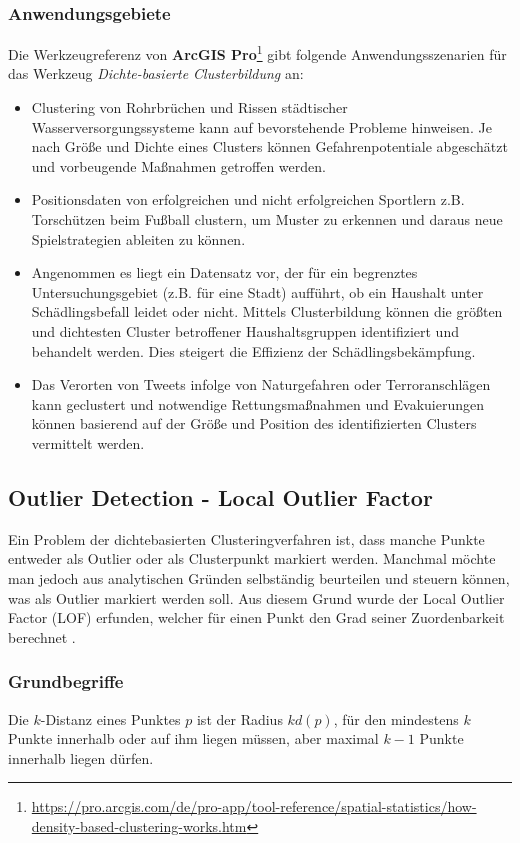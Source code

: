 \documentclass[11pt,ceqn]{book}
\begin{document}
\subsubsection{Anwendungsgebiete}
Die Werkzeugreferenz von \textbf{ArcGIS Pro}\footnote{\url{https://pro.arcgis.com/de/pro-app/tool-reference/spatial-statistics/how-density-based-clustering-works.htm}} gibt folgende Anwendungsszenarien für das Werkzeug \textit{Dichte-basierte Clusterbildung} an:

\begin{itemize}
\item Clustering von Rohrbrüchen und Rissen städtischer Wasserversorgungssysteme kann auf bevorstehende Probleme hinweisen. Je nach Größe und Dichte eines Clusters können Gefahrenpotentiale abgeschätzt und vorbeugende Maßnahmen getroffen werden.
\item Positionsdaten von erfolgreichen und nicht erfolgreichen Sportlern z.B. Torschützen beim Fußball clustern, um Muster zu erkennen und daraus neue Spielstrategien ableiten zu können.
\item Angenommen es liegt ein Datensatz vor, der für ein begrenztes Untersuchungsgebiet (z.B. für eine Stadt) aufführt, ob ein Haushalt unter Schädlingsbefall leidet oder nicht. Mittels Clusterbildung können die größten und dichtesten Cluster betroffener Haushaltsgruppen identifiziert und behandelt werden. Dies steigert die Effizienz der Schädlingsbekämpfung.
\item Das Verorten von Tweets infolge von Naturgefahren oder Terroranschlägen kann geclustert und notwendige Rettungsmaßnahmen und Evakuierungen können basierend auf der Größe und Position des identifizierten Clusters vermittelt werden.
\end{itemize}


\subsection{Outlier Detection - Local Outlier Factor}
Ein Problem der dichtebasierten Clusteringverfahren ist, dass manche Punkte entweder als Outlier oder als Clusterpunkt markiert werden. Manchmal möchte man jedoch aus analytischen Gründen selbständig beurteilen und steuern können, was als Outlier markiert werden soll. Aus diesem Grund wurde der Local Outlier Factor (LOF) erfunden, welcher für einen Punkt den Grad seiner Zuordenbarkeit berechnet \cite{lof}.

\subsubsection{Grundbegriffe}
Die $k$-Distanz eines Punktes $p$ ist der Radius $kd(p)$, für den mindestens $k$ Punkte innerhalb oder auf ihm liegen müssen, aber maximal $k-1$ Punkte innerhalb liegen dürfen. \\
\end{document}
